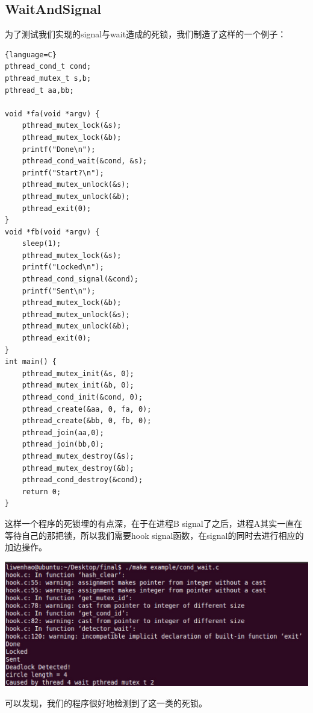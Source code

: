 \documentclass[titlepage]{article}
\begin{document}
\subsection{WaitAndSignal}
\indent 为了测试我们实现的signal与wait造成的死锁，我们制造了这样的一个例子：
\begin{lstlisting}{language=C}
pthread_cond_t cond;
pthread_mutex_t s,b;
pthread_t aa,bb;

void *fa(void *argv) {
	pthread_mutex_lock(&s);
	pthread_mutex_lock(&b);
	printf("Done\n");
	pthread_cond_wait(&cond, &s);
	printf("Start?\n");
	pthread_mutex_unlock(&s);
	pthread_mutex_unlock(&b);
	pthread_exit(0);
}
void *fb(void *argv) {
	sleep(1);
	pthread_mutex_lock(&s);
	printf("Locked\n");
	pthread_cond_signal(&cond);
	printf("Sent\n");
	pthread_mutex_lock(&b);
	pthread_mutex_unlock(&s);
	pthread_mutex_unlock(&b);
	pthread_exit(0);
}
int main() {
	pthread_mutex_init(&s, 0);
	pthread_mutex_init(&b, 0);
	pthread_cond_init(&cond, 0);
	pthread_create(&aa, 0, fa, 0);
	pthread_create(&bb, 0, fb, 0);
	pthread_join(aa,0);
	pthread_join(bb,0);
	pthread_mutex_destroy(&s);
	pthread_mutex_destroy(&b);
	pthread_cond_destroy(&cond);
	return 0;
}

\end{lstlisting}
\indent 这样一个程序的死锁埋的有点深，在于在进程B signal了之后，进程A其实一直在等待自己的那把锁，所以我们需要hook signal函数，在signal的同时去进行相应的加边操作。

\begin{center}
\footnotesize
\includegraphics[scale=0.4]{example4.png}
\normalsize
\end{center}
\indent 可以发现，我们的程序很好地检测到了这一类的死锁。
\end{document}
